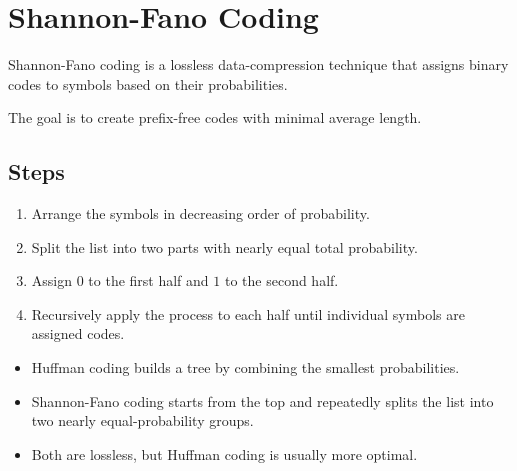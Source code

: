 \documentclass[11pt,a4paper]{book}
\newenvironment{definitionbox}[1][Definition]{%
    \begin{tcolorbox}[
        enhanced,
        breakable,
        colback=primaryblue!10,
        colframe=primaryblue!150,
        title=#1,
        fonttitle=\bfseries,
        sharp corners,
        boxrule=0.8pt,
        left=8pt,
        right=8pt,
        top=6pt,
        bottom=6pt
    ]
}{\end{tcolorbox}}
\newenvironment{infobox}[1][Information]{%
    \begin{tcolorbox}[
        enhanced,
        breakable,
        colback=mintgreen!10,
        colframe=mintgreen!200,
        title=#1,
        fonttitle=\bfseries,
        sharp corners,
        boxrule=0.8pt,
        left=8pt,
        right=8pt,
        top=6pt,
        bottom=6pt
    ]
}{\end{tcolorbox}}
\begin{document}
\clearpage
\section{Shannon-Fano Coding}

\begin{definitionbox}[Shannon-Fano Coding]
Shannon-Fano coding is a lossless data-compression technique that assigns binary codes to symbols based on their probabilities.
\end{definitionbox}

The goal is to create prefix-free codes with minimal average length.

\subsection{Steps}
\begin{enumerate}
    \item Arrange the symbols in decreasing order of probability.
    \item Split the list into two parts with nearly equal total probability.
    \item Assign \(0\) to the first half and \(1\) to the second half.
    \item Recursively apply the process to each half until individual symbols are assigned codes.
\end{enumerate}

\begin{infobox}[First-Timer Idea]
\begin{itemize}
    \item Huffman coding builds a tree by combining the smallest probabilities.
    \item Shannon-Fano coding starts from the top and repeatedly splits the list into two nearly equal-probability groups.
    \item Both are lossless, but Huffman coding is usually more optimal.
\end{itemize}
\end{infobox}
\end{document}
